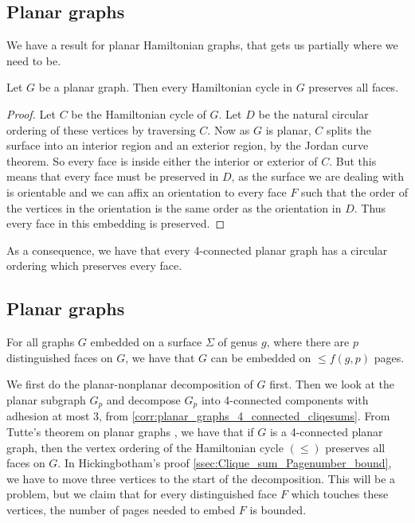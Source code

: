 \subsection{Planar graphs}

We have a result for planar Hamiltonian graphs, that gets us partially where we need to be. 
\begin{theorem}
	Let $G$ be a planar graph. Then every Hamiltonian cycle in $G$ preserves all faces. 
\end{theorem}

\begin{proof}
	Let $C$ be the Hamiltonian cycle of $G$. Let $D$ be the natural circular ordering of these vertices by traversing $C$. Now as $G$ is planar, $C$ splits the surface into an interior region and an exterior region, by the Jordan curve theorem. So every face is inside either the interior or exterior of $C$. But this means that every face must be preserved in $D$, as the surface we are dealing with is orientable and we can affix an orientation to every face $F$ such that the order of the vertices in the orientation is the same order as the orientation in $D$. Thus every face in this embedding is preserved. 
	
\end{proof}
As a consequence, we have that every 4-connected planar graph has a circular ordering which preserves every face. 
\subsection{Planar graphs}
\begin{conjecture}\label{conj:4-planar graphs}
	For all graphs $G$ embedded on a surface $\Sigma$ of genus $g$, where there are $p$ distinguished faces on $G$, we have that $G$ can be embedded on $\leq f(g, p)$ pages.
\end{conjecture}
We first do the planar-nonplanar decomposition of $G$ first. 
Then we look at the planar subgraph $G_p$ and decompose $G_p$ into 4-connected components with adhesion at most 3, from \cref{corr:planar_graphs_4_connected_cliqesums}. 
From Tutte's theorem on planar graphs \cite{tutteTheoremPlanarGraphs1956}, we have that if $G$ is a 4-connected planar graph, then the vertex ordering of the Hamiltonian cycle $(\leq)$ preserves all faces on $G$.
In Hickingbotham's proof \cref{ssec:Clique_sum_Pagenumber_bound}, we have to move three vertices to the start of the decomposition. This will be a problem, but we claim that for every distinguished face $F$ which touches these vertices, the number of pages needed to embed $F$ is bounded. 

